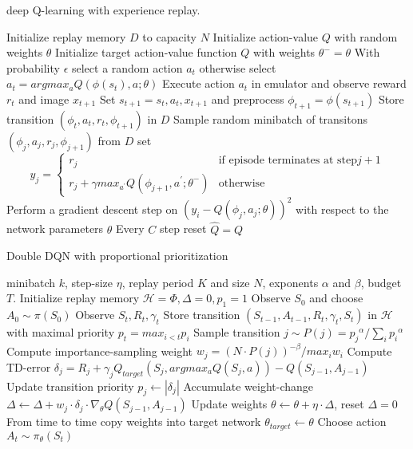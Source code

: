 \documentclass[12pt,a4paper]{article}
\begin{document}
\begin{algorithm}
	\caption{deep Q-learning with experience replay.}
	\begin{algorithmic}
	\State Initialize replay memory $D$ to capacity $N$
 	\State Initialize action-value $Q$ with random weights $\theta$ 
 	\State Initialize target action-value function $Q$ with weights $\theta^{-} = \theta$
 		\State With probability $\epsilon$ select a random action $a_{t}$
 		\State otherwise select $a_{t} = argmax_{a}Q(\phi(s_{t}), a; \theta)$
 		\State Execute action $a_{t}$ in emulator and observe reward $r_{t}$ and image $x_{t+1}$
 		\State Set $s_{t+1} = s_{t}, a_{t}, x_{t+1}$ and preprocess $\phi_{t+1} = \phi(s_{t+1})$
 		\State Store transition $(\phi_{t}, a_{t}, r_{t}, \phi_{t+1})$ in $D$
 		\State Sample random minibatch of transitons $(\phi_{j}, a_{j}, r_{j}, \phi_{j+1})$ from $D$
 		\State set $$y_{j} = \left\{ 
			\begin{array}{cc}
			r_{j} & \text{if episode terminates at step} j+1 \\
			r_{j} + \gamma max_{a^{'}}Q(\phi_{j+1}, a^{'}; \theta^{-}) & \text{otherwise}
			\end{array}\right.
 		$$
 		\State Perform a gradient descent step on $(y_{i} - Q(\phi_{j}, a_{j}; \theta))^{2}$ with respect to the network parameters $\theta$
 		\State Every $C$ step reset $\hat{Q} = Q$
 	\EndFor
	\end{algorithmic}
\end{algorithm}

\begin{algorithm}
	\caption{Double DQN with proportional prioritization}	
	\begin{algorithmic}
	\Require minibatch $k$, step-size $\eta$, replay period $K$ and size $N$, exponents $\alpha$ and $\beta$, budget $T$.
	\State Initialize replay memory $\mathcal{H} = \Phi, \Delta=0, p_{1} = 1$
	\State Observe $S_{0}$ and choose $A_{0} \sim \pi(S_{0})$
	\For{$t = 1 to T$}
		\State Observe $S_{t}, R_{t}, \gamma_{t}$
		\State Store transition $(S_{t-1}, A_{t-1}, R_{t}, \gamma_{t}, S_{t})$ in $\mathcal{H}$ with maximal priority $p_t = max_{i<t}p_{i}$
		\If{t $\equiv$ $0$ mod $K$}
			\For{$j = 1 to k$}
				\State Sample transition $j \sim P(j) = {p_{j}}^{\alpha} / \sum_{i}{p_{i}}^{\alpha}$
				\State Compute importance-sampling weight $w_{j}=(N \cdot P(j))^{-\beta}/max_{i}w_{i}$
				\State Compute TD-error $\delta_{j} = R_{j} + \gamma_{j}Q_{target}(S_{j}, argmax_{a}Q(S_{j}, a)) - Q(S_{j-1}, A_{j-1})$
				\State Update transition priority $p_{j} \leftarrow |\delta_{j}|$
				\State Accumulate weight-change $\Delta \leftarrow \Delta + w_{j} \cdot \delta_{j} \cdot \nabla_{\theta}Q(S_{j-1}, A_{j-1})$
			\EndFor
			\State Update weights $\theta \leftarrow \theta + \eta \cdot \Delta$, reset $\Delta = 0$
			\State From time to time copy weights into target network $\theta_{target} \leftarrow \theta$
		\EndIf
		\State Choose action $A_{t} \sim \pi_{\theta}(S_{t})$
	\EndFor
	
	\end{algorithmic}
\end{algorithm}
\end{document}
